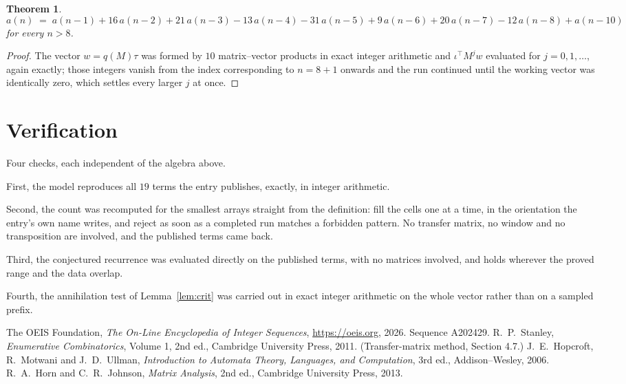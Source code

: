 \documentclass[11pt,a4paper]{article}
\theoremstyle{plain}
\newtheorem{theorem}{Theorem}
\theoremstyle{definition}
\begin{document}
\begin{theorem}
\[
a(n)\;=\;a(n-1) + 16\,a(n-2) + 21\,a(n-3) - 13\,a(n-4) - 31\,a(n-5) + 9\,a(n-6) + 20\,a(n-7) - 12\,a(n-8) + a(n-10)
\]
for every $n>8$.
\end{theorem}

\begin{proof}
The vector $w=q(M)\tau$ was formed by $10$ matrix--vector products in exact integer
arithmetic and $\iota^{\!\top}M^{j}w$ evaluated for $j=0,1,\dots$, again exactly; those
integers vanish from the index corresponding to $n=8+1$ onwards and the run continued
until the working vector was identically zero, which settles every larger $j$ at once.
\end{proof}

\section{Verification}

Four checks, each independent of the algebra above.

First, the model reproduces all $19$ terms the entry publishes, exactly, in integer
arithmetic.

Second, the count was recomputed for the smallest arrays straight from the definition: fill the
cells one at a time, in the orientation the entry's own name writes, and reject as soon as a
completed run matches a forbidden pattern. No transfer matrix, no window and no transposition
are involved, and the published terms came back.

Third, the conjectured recurrence was evaluated directly on the published terms, with no
matrices involved, and holds wherever the proved range and the data overlap.

Fourth, the annihilation test of Lemma~\ref{lem:crit} was carried out in exact integer
arithmetic on the whole vector rather than on a sampled prefix.

\begin{thebibliography}{9}
 The OEIS Foundation, \emph{The On-Line Encyclopedia of Integer
Sequences}, \url{https://oeis.org}, 2026. Sequence A202429.
 R.~P.~Stanley, \emph{Enumerative Combinatorics}, Volume 1, 2nd ed.,
Cambridge University Press, 2011. (Transfer-matrix method, Section 4.7.)
 J.~E.~Hopcroft, R.~Motwani and J.~D.~Ullman, \emph{Introduction to Automata
Theory, Languages, and Computation}, 3rd ed., Addison--Wesley, 2006.
 R.~A.~Horn and C.~R.~Johnson, \emph{Matrix Analysis}, 2nd ed., Cambridge
University Press, 2013.
\end{thebibliography}
\end{document}
